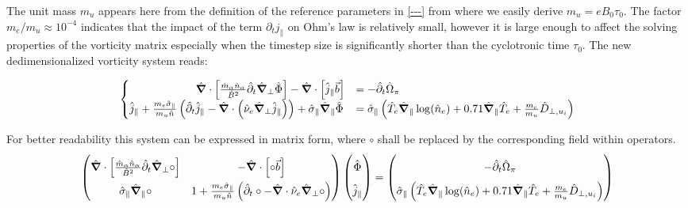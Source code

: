 The unit mass $m_u$ appears here from the definition of the reference parameters in \autoref{---} from where we easily derive $m_u = eB_0\tau_0$. The factor $m_e / m_u \approx 10^{-4}$ indicates that the impact of the term $\partial_t j_\parallel$ on Ohm's law is relatively small, however it is large enough to affect the solving properties of the vorticity matrix especially when the timestep size is significantly shorter than the cyclotronic time $\tau_0$. The new dedimensionalized vorticity system reads:


\begin{equation}
	\label{eq:vorticityEquation_ElectronInertia_dedimensionalized}
	\begin{cases}
		\qquad\qquad\qquad \hat{\grad}\cdot\left[\frac{\hat{m}_\alpha \hat{n}_\alpha}{ \hat{B}^2}\hat{\partial}_t\hat{\grad}_\perp\hat{\Phi}\right] - \hat{\grad}\cdot\left[\hat{j}_\parallel \vec{b}\right]
		&= -\hat{\partial}_t \hat{\Omega}_\pi \\
		\hat{j}_\parallel + \frac{m_e\hat{\sigma}_\parallel}{m_u\hat{n}}\left(\hat{\partial}_t\hat{j}_\parallel - \hat{\grad}\cdot\left(\hat{\nu}_e\hat{\grad}_\perp \hat{j}_\parallel\right)\right) + \hat{\sigma}_\parallel\hat{\grad}_\parallel\hat{\Phi} &= \hat{\sigma}_\parallel \left(\hat{T}_e\hat{\grad}_\parallel\log(\hat{n}_e) + 0.71\hat{\grad}_\parallel \hat{T}_e + \frac{m_e}{m_u}\hat{D}_{\perp,u_i}\right)
	\end{cases}
\end{equation}

For better readability this system can be expressed in matrix form, where $\circ$ shall be replaced by the corresponding field within operators.
\begin{equation}
	\label{eq:vorticityEquation_ElectronInertia_dedimensionalized_matrix}
	\renewcommand\arraystretch{1.8}
	\begin{pmatrix}
		\hat{\grad}\cdot\left[\frac{\hat{m}_\alpha \hat{n}_\alpha}{ \hat{B}^2}\hat{\partial}_t\hat{\grad}_\perp\circ\right] & 
		- \hat{\grad}\cdot\left[\circ\vec{b}\right] \\
		\hat{\sigma}_\parallel\hat{\grad}_\parallel\circ &
		1 + \frac{m_e\hat{\sigma}_\parallel}{m_u\hat{n}}\left(\hat{\partial}_t\circ - \hat{\grad}\cdot\hat{\nu}_e\hat{\grad}_\perp\circ\right)
	\end{pmatrix}
	\begin{pmatrix}
		\hat{\Phi} \\ \hat{j}_\parallel 
	\end{pmatrix} = 
	\begin{pmatrix}
		-\hat{\partial}_t \hat{\Omega}_\pi \\
		\hat{\sigma}_\parallel \left(\hat{T}_e\hat{\grad}_\parallel\log(\hat{n}_e) + 0.71\hat{\grad}_\parallel \hat{T}_e + \frac{m_e}{m_u}\hat{D}_{\perp,u_i}\right)
	\end{pmatrix}
\end{equation}



